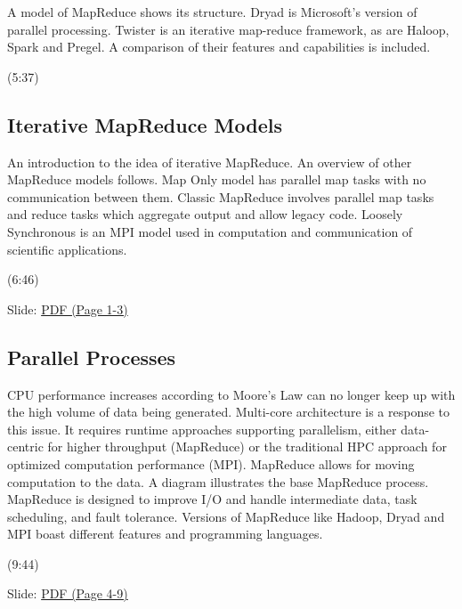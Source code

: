 A model of MapReduce shows its structure. Dryad is Microsoft's version
of parallel processing. Twister is an iterative map-reduce framework, as
are Haloop, Spark and Pregel. A comparison of their features and
capabilities is included.




  (5:37)


\subsection{Iterative MapReduce
Models}

An introduction to the idea of iterative MapReduce. An overview of other
MapReduce models follows. Map Only model has parallel map tasks with no
communication between them. Classic MapReduce involves parallel map
tasks and reduce tasks which aggregate output and allow legacy code.
Loosely Synchronous is an MPI model used in computation and
communication of scientific applications.




  (6:46)

  Slide:
  \href{https://drive.google.com/open?id=0B88HKpainTSfMFBaNHprbWJwQms}{PDF
  (Page 1-3)}


\subsection{Parallel Processes}

CPU performance increases according to Moore's Law can no longer keep up
with the high volume of data being generated. Multi-core architecture is
a response to this issue. It requires runtime approaches supporting
parallelism, either data-centric for higher throughput (MapReduce) or
the traditional HPC approach for optimized computation performance
(MPI). MapReduce allows for moving computation to the data. A diagram
illustrates the base MapReduce process. MapReduce is designed to improve
I/O and handle intermediate data, task scheduling, and fault tolerance.
Versions of MapReduce like Hadoop, Dryad and MPI boast different
features and programming languages.




  (9:44)

  Slide:
  \href{https://drive.google.com/open?id=0B88HKpainTSfMFBaNHprbWJwQms}{PDF
  (Page 4-9)}



